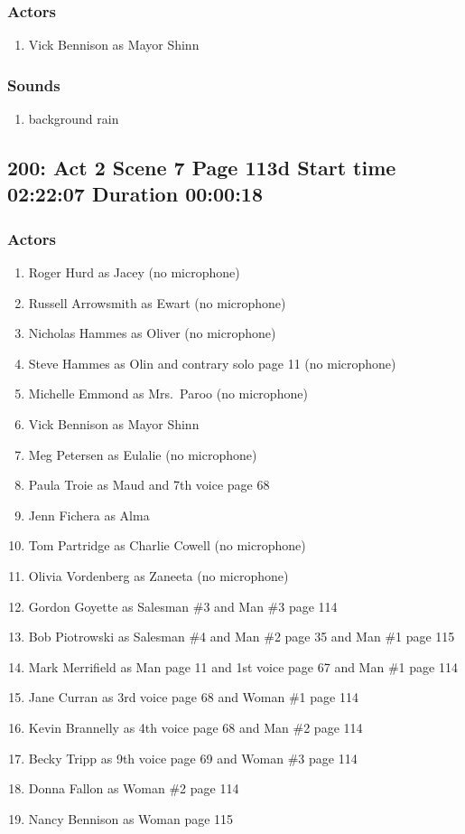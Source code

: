 \subsubsection{Actors}
\begin{enumerate}
\item Vick Bennison as Mayor Shinn
\end{enumerate}

\subsubsection{Sounds}
\begin{enumerate}
\item background rain
\end{enumerate}
\subsection{200: Act 2 Scene 7 Page 113d Start time 02:22:07 Duration 00:00:18}

\subsubsection{Actors}
\begin{enumerate}
\item Roger Hurd as Jacey (no microphone)
\item Russell Arrowsmith as Ewart (no microphone)
\item Nicholas Hammes as Oliver (no microphone)
\item Steve Hammes as Olin and contrary solo page 11 (no microphone)
\item Michelle Emmond as Mrs.~Paroo (no microphone)
\item Vick Bennison as Mayor Shinn
\item Meg Petersen as Eulalie (no microphone)
\item Paula Troie as Maud and 7th voice page 68
\item Jenn Fichera as Alma
\item Tom Partridge as Charlie Cowell (no microphone)
\item Olivia Vordenberg as Zaneeta (no microphone)
\item Gordon Goyette as Salesman \#3 and Man \#3 page 114
\item Bob Piotrowski as Salesman \#4 and Man \#2 page 35 and Man \#1 page 115
\item Mark Merrifield as Man page 11 and 1st voice page 67 and Man \#1 page 114
\item Jane Curran as 3rd voice page 68 and Woman \#1 page 114
\item Kevin Brannelly as 4th voice page 68 and Man \#2 page 114
\item Becky Tripp as 9th voice page 69 and Woman \#3 page 114
\item Donna Fallon as Woman \#2 page 114
\item Nancy Bennison as Woman page 115
\end{enumerate}

